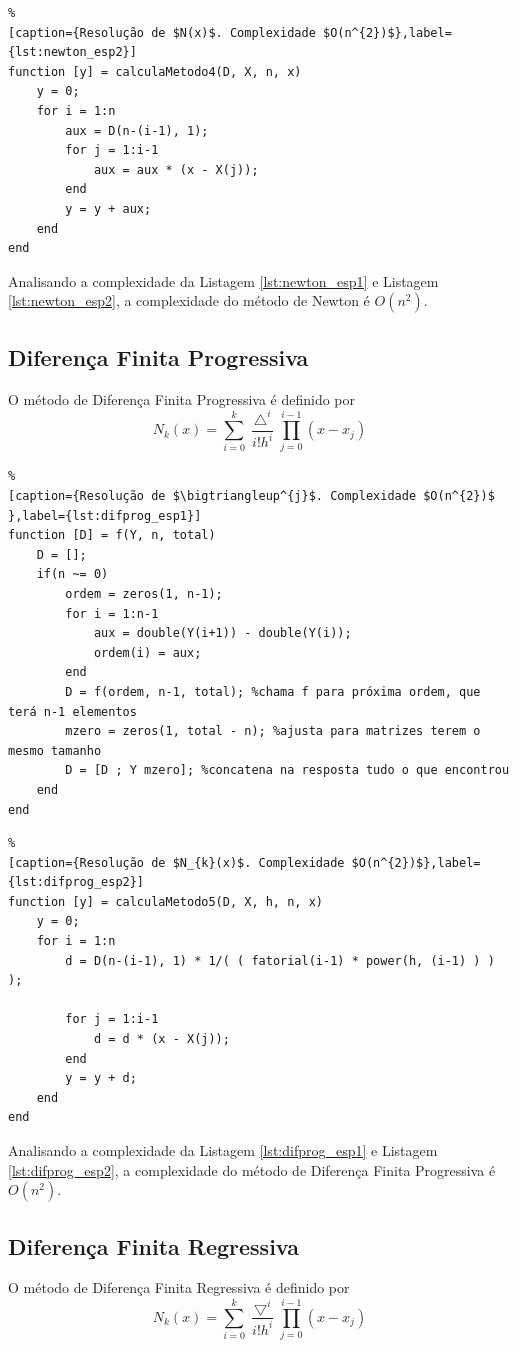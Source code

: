 \documentclass[conference]{IEEEtran}
\begin{document}
\begin{lstlisting}%
[caption={Resolução de $N(x)$. Complexidade $O(n^{2})$},label={lst:newton_esp2}]
function [y] = calculaMetodo4(D, X, n, x)
    y = 0;
    for i = 1:n
        aux = D(n-(i-1), 1);
        for j = 1:i-1
            aux = aux * (x - X(j));
        end
        y = y + aux;
    end
end
\end{lstlisting}
Analisando a complexidade da Listagem \ref{lst:newton_esp1} e Listagem \ref{lst:newton_esp2}, a complexidade do método de Newton é $O(n^{2})$.

\subsection{Diferença Finita Progressiva} \label{subsec:difprog}
O método de Diferença Finita Progressiva é definido por
\begin{equation}
N_{k}(x) = \sum_{i=0}^{k}\frac{\bigtriangleup^{i}}{i!h^{i}} \prod_{j=0}^{i-1}(x-x_{j})
\end{equation}

\begin{lstlisting}%
[caption={Resolução de $\bigtriangleup^{j}$. Complexidade $O(n^{2})$ },label={lst:difprog_esp1}]
function [D] = f(Y, n, total)
    D = [];
    if(n ~= 0)
        ordem = zeros(1, n-1);
        for i = 1:n-1
            aux = double(Y(i+1)) - double(Y(i));
            ordem(i) = aux;
        end
        D = f(ordem, n-1, total); %chama f para próxima ordem, que terá n-1 elementos
        mzero = zeros(1, total - n); %ajusta para matrizes terem o mesmo tamanho
        D = [D ; Y mzero]; %concatena na resposta tudo o que encontrou
    end
end
\end{lstlisting}
\begin{lstlisting}%
[caption={Resolução de $N_{k}(x)$. Complexidade $O(n^{2})$},label={lst:difprog_esp2}]
function [y] = calculaMetodo5(D, X, h, n, x)
    y = 0;
    for i = 1:n
        d = D(n-(i-1), 1) * 1/( ( fatorial(i-1) * power(h, (i-1) ) ) );

        for j = 1:i-1
            d = d * (x - X(j));
        end
        y = y + d;
    end
end
\end{lstlisting}
Analisando a complexidade da Listagem \ref{lst:difprog_esp1} e Listagem \ref{lst:difprog_esp2}, a complexidade do método de Diferença Finita Progressiva é $O(n^{2})$.

\subsection{Diferença Finita Regressiva} \label{subsec:difreg}
O método de Diferença Finita Regressiva é definido por
\begin{equation}
N_{k}(x) = \sum_{i=0}^{k}\frac{\bigtriangledown^{i}}{i!h^{i}} \prod_{j=0}^{i-1}(x-x_{j})
\end{equation}
\end{document}
